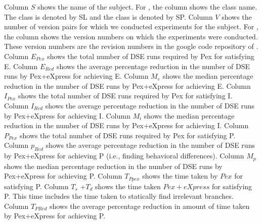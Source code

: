Column $S$ shows the name of the subject. For , the column shows the class name. The class  is denoted by SL and the class  is denoted by SP. Column $V$ shows the number of version pairs for which we conducted experiments for the subject. For , the column shows the version numbers on which the experiments were conducted. These version numbers are the revision numbers in the google code repository of . 
Column $E_{Pex}$ shows the total number of DSE runs required by Pex for satisfying E. 
Column $E_{Red}$ shows the average percentage reduction in the number of DSE runs by Pex+eXpress for achieving E. 
Column $M_e$ shows the median percentage reduction in the number of DSE runs by Pex+eXpress for achieving E. 
Column $I_{Pex}$ shows the total number of DSE runs required by Pex for satisfying I. 
Column $I_{Red}$ shows the average percentage reduction in the number of DSE runs by Pex+eXpress for achieving I. 
Column $M_i$ shows the median percentage reduction in the number of DSE runs by Pex+eXpress for achieving I.
Column $P_{Pex}$ shows the total number of DSE runs required by Pex for satisfying P. 
Column $p_{Red}$ shows the average percentage reduction in the number of DSE runs by Pex+eXpress for achieving P (i.e., finding behavioral differences). 
Column $M_p$ shows the median percentage reduction in the number of DSE runs by Pex+eXpress for achieving P.
Column $T_{Ppex}$ shows the time taken by $Pex$ for satisfying P.
Column $T_s$ +$T_d$ shows the time taken $Pex+eXpress$ for satisfying P. This time includes the time taken to statically find irrelevant branches. 
Column $T_{PRed}$ shows the average percentage reduction in amount of time taken by Pex+eXpress for achieving P. 

